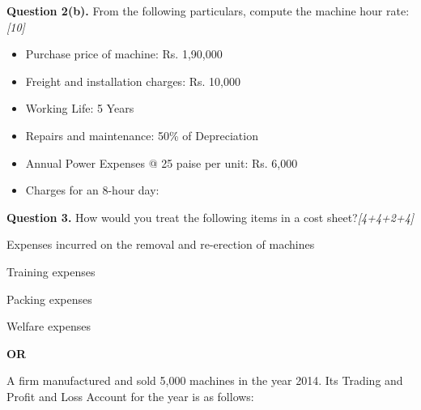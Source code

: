 \documentclass[11pt,a4paper]{article}
\newcommand{\pts}[1]{\hfill   \textit{[#1]}}
\begin{document}
\smallskip



\noindent   \textbf{Question 2(b).}
From the following particulars, compute the machine hour rate:\pts{10}

\begin{itemize}[itemsep=3pt,topsep=2pt]
  \item Purchase price of machine: Rs. 1,90,000
  \item Freight and installation charges: Rs. 10,000
  \item Working Life: 5 Years
  \item Repairs and maintenance: 50\% of Depreciation
  \item Annual Power Expenses @ 25 paise per unit: Rs. 6,000
  \item Charges for an 8-hour day:
    
\end{itemize}

\pagebreak




\noindent   \textbf{Question 3.}
How would you treat the following items in a cost sheet?\pts{4+4+2+4}

\begin{parts}
  \item Expenses incurred on the removal and re-erection of machines
  \item Training expenses
  \item Packing expenses
  \item Welfare expenses
\end{parts}

\centerline{   \textbf{OR}}

A firm manufactured and sold 5,000 machines in the year 2014. Its Trading and Profit and Loss Account for the year is as follows:
\end{document}
